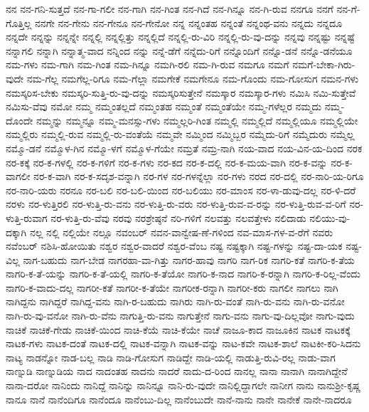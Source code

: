 {ನನ
ನನ-ಗನಿ-ಸುತ್ತದೆ
ನನ-ಗಾ-ಗಲೀ
ನನ-ಗಾಗಿ
ನನ-ಗಿಂತ
ನನ-ಗಿದೆ
ನನ-ಗಿನ್ನೂ
ನನ-ಗಿ-ರುವ
ನನಗೂ
ನನಗೆ
ನನ-ಗೆ-ಗೊತ್ತಿಲ್ಲ
ನನಗೇ
ನನ-ಗೇನು
ನನ-ಗೇನೂ
ನನ-ಗೇನೋ
ನನ್ನ
ನನ್ನಂತಹ
ನನ್ನಂತೆ
ನನ್ನಂಥ-ವನು
ನನ್ನದು
ನನ್ನದೂ
ನನ್ನದೇ
ನನ್ನನ್ನು
ನನ್ನನ್ನೇ
ನನ್ನಲ್ಲಿ
ನನ್ನಲ್ಲಿತ್ತು
ನನ್ನಲ್ಲಿದೆ
ನನ್ನಲ್ಲಿ-ರು-ವಿರಿ
ನನ್ನಲ್ಲಿ-ರು-ವು-ದನ್ನು
ನನ್ನವು
ನನ್ನಷ್ಟು
ನನ್ನಷ್ಟೆ
ನನ್ನಾಗಲಿ
ನನ್ನಾಗಿ
ನನ್ನಾತ್ಮ-ವಾದ
ನನ್ನಿಂದ
ನನ್ನು
ನನ್ನೆ-ಡೆಗೆ
ನನ್ನೆದು-ರಿಗೆ
ನನ್ನೊಂದಿಗೆ
ನನ್ನೊ-ಡನೆ
ನನ್ನೊ-ಡನೆಯೂ
ನಮ-ಗಳು
ನಮ-ಗಾಗಿ
ನಮ-ಗಿಂತ
ನಮ-ಗಿನ್ನೂ
ನಮಗಿ-ರಲಿ
ನಮ-ಗಿ-ರುವ
ನಮಗೂ
ನಮಗೆ
ನಮಗೆ-ಬೇಕಾ-ಗಿರು-ವುದೇ
ನಮ-ಗೆಲ್ಲ
ನಮಗೆಲ್ಲ-ರಿಗೂ
ನಮ-ಗೆಲ್ಲಾ
ನಮಗೇಕೆ
ನಮಗೇನೂ
ನಮ-ಗೊಂದು
ನಮ-ಗೋಸುಗ
ನಮನ-ಗಳು
ನಮಸ್ಕರಿಸ-ಬೇಕು
ನಮಸ್ಕರಿ-ಸುತ್ತಿ-ರು-ವು-ದನ್ನು
ನಮಸ್ಕರಿಸುತ್ತೇನೆ
ನಮಸ್ಕಾರ
ನಮಸ್ಕಾರ-ಗಳು
ನಮಿಸಿ
ನಮಿ-ಸುತ್ತೇವೆ
ನಮಿಸು-ವೆವು
ನಮೋ
ನಮ್ಮ
ನಮ್ಮಂತಲ್ಲದೆ
ನಮ್ಮಂತಹ
ನಮ್ಮಂತೆ
ನಮ್ಮಂತೆಯೇ
ನಮ್ಮ-ಗಳೆಲ್ಲರ
ನಮ್ಮದು
ನಮ್ಮ-ದೊಂದೇ
ನಮ್ಮನ್ನು
ನಮ್ಮನ್ನೂ
ನಮ್ಮ-ಮನಸ್ಸು-ಗಳು
ನಮ್ಮಲ್ಲರಿ-ಗಿಂತ
ನಮ್ಮಲ್ಲಿ
ನಮ್ಮಲ್ಲಿದೆ
ನಮ್ಮಲ್ಲಿಯೂ
ನಮ್ಮಲ್ಲಿಯೇ
ನಮ್ಮಲ್ಲಿರು
ನಮ್ಮಲ್ಲಿ-ರುವ
ನಮ್ಮಲ್ಲಿ-ರು-ವಂತೆಯೆ
ನಮ್ಮವೇ
ನಮ್ಮಿಂದ
ನಮ್ಮಿಬ್ಬರ
ನಮ್ಮೆದು-ರಿಗೆ
ನಮ್ಮೆದುರು
ನಮ್ಮೆಲ್ಲ
ನಮ್ಮೊ-ಡನೆ
ನಮ್ಮೊಳ-ಗಿನ
ನಮ್ಮೊ-ಳಗೆ
ನಮ್ಮೊಳ-ಗೆಯೇ
ನಮ್ರತೆ
ನಮ್ರ-ನಾಗಿ
ನಯ-ವಾದ
ನಯ-ವಿನ-ಯ-ದಿಂದ
ನರಕ
ನರ-ಕಕ್ಕೆ
ನರ-ಕ-ಗಳಲ್ಲಿ
ನರ-ಕ-ಗಳಿಗೆ
ನರ-ಕ-ಗಳು
ನರ-ಕದ
ನರ-ಕ-ದಲ್ಲಿ
ನರ-ಕ-ಮಯ-ವಾಗಿ
ನರ-ಕ-ವನ್ನು
ನರ-ಕ-ವಾಗಲೀ
ನರ-ಕ-ವಾಗಿ
ನರ-ಕ-ಸದೃಶ-ವನ್ನಾಗಿ
ನರ-ಗಳ
ನರ-ಗಳನ್ನೆಲ್ಲಾ
ನರ-ಗಳು
ನರದ
ನರ-ದಲ್ಲಿ
ನರ-ನಾರಿ-ಯ-ರಿಗೂ
ನರ-ನಾರಿ-ಯರು
ನರನೂ
ನರ-ಬಲಿ
ನರ-ಬಲಿ-ಯಿಂದ
ನರ-ಬಲಿಯು
ನರ-ಮಾಂಸ
ನರ-ಳಾ-ಡುವು-ದಲ್ಲ
ನರ-ಳಿ-ದರೆ
ನರಳು
ನರ-ಳುತ್ತಿರಲಿ
ನರ-ಳುತ್ತಿ-ರು-ವನು
ನರ-ಳುತ್ತಿ-ರು-ವರು
ನರ-ಳುತ್ತಿ-ರುವ-ವ-ರನ್ನು
ನರ-ಳುತ್ತಿ-ರುವ-ವ-ರಿಗೆ
ನರ-ಳುತ್ತಿ-ರುವಾಗ
ನರ-ಳುತ್ತಿ-ರು-ವೆವು
ನರವು
ನರಶ್ರೇಷ್ಠನೆ
ನರಿ-ಗಳಿಗೆ
ನಲವತ್ತು
ನಲವತ್ತೇಳು
ನಲಿದಾಡು
ನಲಿಯು-ವು-ದಕ್ಕಾಗಿ
ನಲ್ಲ
ನಲ್ಲಿ
ನಲ್ಲಿಯೇ
ನಲ್ಲೂ
ನವಂಬರ್
ನವನ-ವಾನ್ವೇಷ-ಣೆ-ಗಳಿಂದ
ನವ-ಮಾಸ-ಗಳ-ವ-ರೆಗೆ
ನವರು
ನವೆಂಬರ್
ನಶಿಸಿ-ಹೋಯಿತು
ನಶ್ವರ
ನಶ್ವರ-ವಾದರೆ
ನಶ್ವರ-ವೆಂಬ
ನಷ್ಟ
ನಷ್ಟಕ್ಕಾಗಿ
ನಷ್ಟ-ಗಳನ್ನು
ನಷ್ಟ-ದಾ-ಯಕ
ನಷ್ಟ-ವಿಲ್ಲ
ನಾಗ-ಬಹುದು
ನಾಗ-ಬೇಡ
ನಾಗರಹಾ-ವಾ-ಗಿತ್ತು
ನಾಗರ-ಹಾವು
ನಾಗರಿ
ನಾಗ-ರಿಕ
ನಾಗರಿ-ಕತೆ
ನಾಗರಿ-ಕ-ತೆಯ
ನಾಗರಿ-ಕ-ತೆ-ಯನ್ನು
ನಾಗರಿ-ಕ-ತೆ-ಯಲ್ಲಿ
ನಾಗರಿ-ಕ-ತೆಯೋ
ನಾಗರಿ-ಕ-ನಾದ
ನಾಗರಿ-ಕ-ರನ್ನಾಗಿ
ನಾಗರಿ-ಕ-ರಿಲ್ಲ-ವೆಂದು
ನಾಗರಿ-ಕ-ವಾದು-ದಲ್ಲ
ನಾಗರೀ-ಕತೆ
ನಾಗರೀ-ಕ-ತೆಯೇ
ನಾಗರೀಕ-ರನ್ನಾಗಿ
ನಾಗರೀ-ಕರು
ನಾಗಲೀ
ನಾಗಲು
ನಾಗಿ
ನಾಗಿದ್ದನು
ನಾಗಿದ್ದರೆ
ನಾಗಿದ್ದ-ವನು
ನಾಗಿ-ರ-ಬಹುದು
ನಾಗಿರು
ನಾಗಿ-ರು-ವಂತೆ
ನಾಗಿ-ರು-ವನು
ನಾಗಿ-ರು-ವನೋ
ನಾಗಿ-ರು-ವು-ವನೋ
ನಾಗಿ-ರು-ವೆನು
ನಾಗುತ್ತಿ-ರು-ವನು
ನಾಗುತ್ತೇನೆ
ನಾಗು-ವನು
ನಾಗು-ವು-ದಿಲ್ಲವೋ
ನಾಗು-ವುದು
ನಾಚಿಕೆ
ನಾಚಿಕೆ-ಗೇಡು
ನಾಚಿಕೆ-ಯಿಂದ
ನಾಚಿ-ಕೆಯೆ
ನಾಚಿ-ಕೆಯೇ
ನಾಚೆ
ನಾಜೂ-ಕಾದ
ನಾಜೂಕಿನ
ನಾಟಕ
ನಾಟಕಕ್ಕೆ
ನಾಟಕ-ಗಳು
ನಾಟಕ-ದಂತೆ
ನಾಟಕ-ದಲ್ಲಿ
ನಾಟಕ-ವನ್ನಾಗಿ
ನಾಟಕ-ವನ್ನು
ನಾಟ-ಕವೇ
ನಾಟಕ-ಶಾಲೆ
ನಾಟಕೀ-ಕರಿ-ಸಿದನು
ನಾಟ್ಯ
ನಾಡನ್ನೋ
ನಾಡ-ಬಲ್ಲ
ನಾಡಿ
ನಾಡಿ-ಗೋಸುಗ
ನಾಡಿದ್ದೇ
ನಾಡಿ-ಯಲ್ಲಿ
ನಾಡುತ್ತಿ-ರುವಿ-ರಲ್ಲ
ನಾಡು-ವಾಗ
ನಾಣ್ನುಡಿ
ನಾಣ್ನುಡಿಯ
ನಾದ
ನಾದಂತಹ
ನಾದನು
ನಾದರೆ
ನಾದು-ದ-ರಿಂದ
ನಾನಲ್ಲ
ನಾನಾ
ನಾನಾಗಿ
ನಾನಾಗಿದ್ದೇನೆ
ನಾನಾ-ದರೋ
ನಾನಿಂದು
ನಾನಿದ್ದೆ
ನಾನಿನ್ನು
ನಾನಿನ್ನೂ
ನಾನಿ-ರು-ವುದೇ
ನಾನಿಲ್ಲಿದ್ದಾಗಲೇ
ನಾನೀಗ
ನಾನು
ನಾನುಶ್ರೀ-ಕೃಷ್ಣ
ನಾನೂ
ನಾನೆ
ನಾನೆಂದಿಗೂ
ನಾನೆಂದೂ
ನಾನೆಂಬು-ದಿಲ್ಲ
ನಾನೆಂಬುದೇ
ನಾನೆ-ನಾನು
ನಾನೇ
ನಾನೇಕೆ
ನಾನೇ-ನಾದರೂ
}
